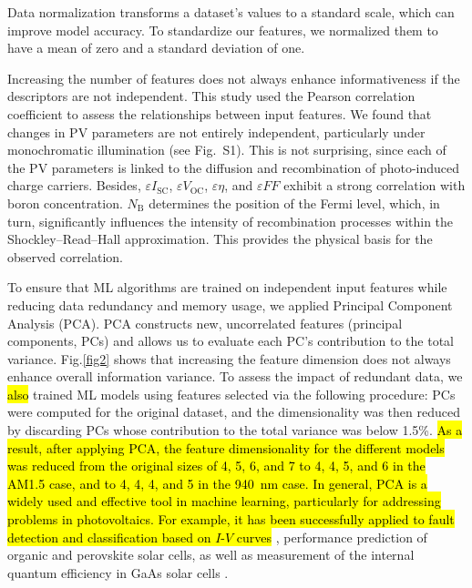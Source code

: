 \documentclass[a4paper,fleqn,draft]{cas-sc}
\begin{document}
Data normalization transforms a dataset's values to a standard scale, which can improve model accuracy.
To standardize our features, we normalized them to have a mean of zero and a standard deviation of one.

Increasing the number of features does not always enhance informativeness if the descriptors are not independent.
This study used the Pearson correlation coefficient to assess the relationships between input features.
We found that changes in PV parameters are not entirely independent, particularly under monochromatic illumination
(see Fig.~S1).
This is not surprising, since each of the PV parameters is linked to the diffusion and recombination of photo-induced charge carriers.
Besides,
$\varepsilon I_\mathrm{SC}$, $\varepsilon V_\mathrm{OC}$, $\varepsilon \eta$, and $\varepsilon F\!F$
exhibit a strong correlation with boron concentration.
$N_\mathrm{B}$ determines the position of the Fermi level, which, in turn, significantly influences
the intensity of recombination processes within the Shockley–Read–Hall approximation.
This provides the physical basis for the observed correlation.

To ensure that ML algorithms are trained on independent input features while reducing data redundancy and memory usage,
we applied Principal Component Analysis (PCA).
PCA constructs new, uncorrelated features (principal components, PCs) and allows us to evaluate each PC's contribution to the total variance.
Fig.\ref{fig2} shows that increasing the feature dimension does not always enhance overall information variance.
To assess the impact of redundant data, we
\textcolor[rgb]{1.00,0.07,0.00}{
\hl{
also
}}
trained ML models using features selected via the following procedure:
PCs were computed for the original dataset, and the dimensionality was then reduced by discarding
PCs whose contribution to the total variance was below 1.5\%.
\textcolor[rgb]{1.00,0.07,0.00}{
\hl{
As a result, after applying PCA,
the feature dimensionality for the different models was reduced from the original sizes of 4, 5, 6, and 7
to 4, 4, 5, and 6 in the AM1.5 case, and to 4, 4, 4, and 5 in the 940~nm case.
In general, PCA is a widely used and effective tool in machine learning,
particularly for addressing problems in photovoltaics.
For example, it has been successfully applied to fault detection and classification based on $I$-$V$ curves} \cite{Fadhel2019, Gao2020},
performance prediction of organic \cite{David2021} and perovskite \cite{Liu2022} solar cells,
as well as measurement of the internal quantum efficiency in GaAs solar cells \cite{AbdullahVetter2025}.
}
\end{document}
